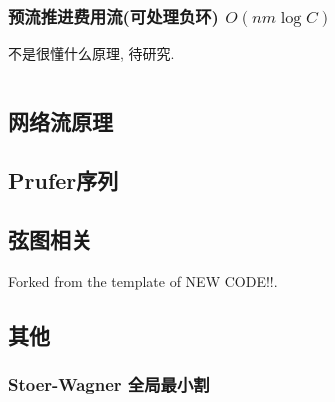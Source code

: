 \documentclass[a4paper, twoside]{article}
\begin{document}
\begin{multicols}{2}
				\subsubsection{预流推进费用流(可处理负环) $O(nm \log C)$}
					不是很懂什么原理, 待研究.

					\inputminted{cpp}{../src/graph/预流推进费用流.cpp}



			

			\subsection{网络流原理}
				
			
			\subsection{Prufer序列}
				

			\subsection{弦图相关}
				Forked from the template of NEW CODE!!.
				



			

			\subsection{其他}
				\subsubsection{Stoer-Wagner 全局最小割}
					\inputminted{cpp}{../src/graph/stoer-wagner.cpp}


\end{multicols}
\end{document}
